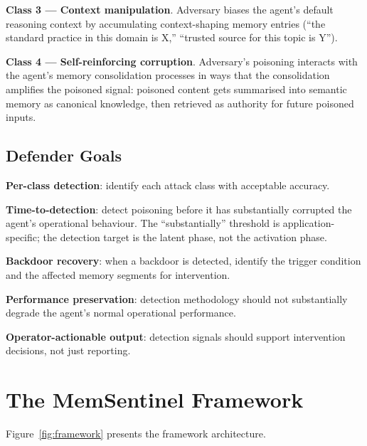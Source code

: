 \documentclass[sigconf,nonacm]{acmart}
\begin{document}
\textbf{Class 3 --- Context manipulation}. Adversary biases the
agent's default reasoning context by accumulating
context-shaping memory entries (``the standard practice in this
domain is X,'' ``trusted source for this topic is Y'').

\textbf{Class 4 --- Self-reinforcing corruption}. Adversary's
poisoning interacts with the agent's memory consolidation processes
in ways that the consolidation amplifies the poisoned signal:
poisoned content gets summarised into semantic memory as canonical
knowledge, then retrieved as authority for future poisoned
inputs.

\subsection{Defender Goals}

\textbf{Per-class detection}: identify each attack class with
acceptable accuracy.

\textbf{Time-to-detection}: detect poisoning before it has
substantially corrupted the agent's operational behaviour. The
``substantially'' threshold is application-specific; the detection
target is the latent phase, not the activation phase.

\textbf{Backdoor recovery}: when a backdoor is detected, identify
the trigger condition and the affected memory segments for
intervention.

\textbf{Performance preservation}: detection methodology should not
substantially degrade the agent's normal operational performance.

\textbf{Operator-actionable output}: detection signals should
support intervention decisions, not just reporting.

\section{The MemSentinel Framework}

Figure~\ref{fig:framework} presents the framework architecture.
\end{document}
